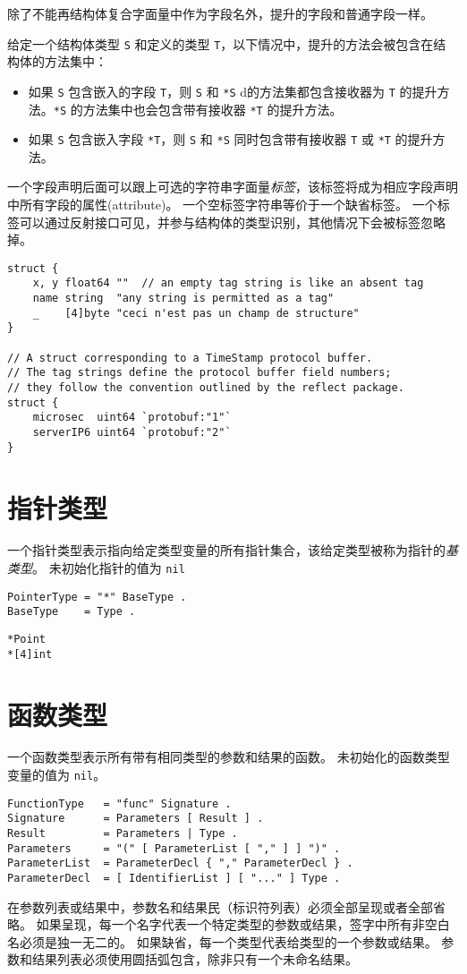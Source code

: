 除了不能再结构体复合字面量中作为字段名外，提升的字段和普通字段一样。

给定一个结构体类型 \lstinline|S| 和定义的类型 \lstinline|T|，以下情况中，提升的方法会被包含在结构体的方法集中：
\begin{itemize}
\item 如果 \lstinline|S| 包含嵌入的字段 \lstinline|T|，则 \lstinline|S| 和 \lstinline|*S| d的方法集都包含接收器为 \lstinline|T| 的提升方法。\lstinline|*S| 的方法集中也会包含带有接收器 \lstinline|*T| 的提升方法。
\item  如果 \lstinline|S| 包含嵌入字段 \lstinline|*T|，则 \lstinline|S| 和 \lstinline|*S| 同时包含带有接收器 \lstinline|T| 或 \lstinline|*T| 的提升方法。
\end{itemize}

一个字段声明后面可以跟上可选的字符串字面量\emph{标签}，该标签将成为相应字段声明中所有字段的属性(attribute)。
一个空标签字符串等价于一个缺省标签。
一个标签可以通过反射接口可见，并参与结构体的类型识别，其他情况下会被标签忽略掉。
\begin{lstlisting}[style=golang]
struct {
	x, y float64 ""  // an empty tag string is like an absent tag
	name string  "any string is permitted as a tag"
	_    [4]byte "ceci n'est pas un champ de structure"
}

// A struct corresponding to a TimeStamp protocol buffer.
// The tag strings define the protocol buffer field numbers;
// they follow the convention outlined by the reflect package.
struct {
	microsec  uint64 `protobuf:"1"`
	serverIP6 uint64 `protobuf:"2"`
}
\end{lstlisting}


\section{指针类型}
一个指针类型表示指向给定类型变量的所有指针集合，该给定类型被称为指针的\emph{基类型}。
未初始化指针的值为 \lstinline|nil|
\begin{lstlisting}[style=EBNF]
PointerType = "*" BaseType .
BaseType    = Type .
\end{lstlisting}

\begin{lstlisting}[style=golang]
*Point
*[4]int
\end{lstlisting}

\section{函数类型}
一个函数类型表示所有带有相同类型的参数和结果的函数。
未初始化的函数类型变量的值为 \lstinline|nil|。
\begin{lstlisting}[style=EBNF]
FunctionType   = "func" Signature .
Signature      = Parameters [ Result ] .
Result         = Parameters | Type .
Parameters     = "(" [ ParameterList [ "," ] ] ")" .
ParameterList  = ParameterDecl { "," ParameterDecl } .
ParameterDecl  = [ IdentifierList ] [ "..." ] Type .
\end{lstlisting}
在参数列表或结果中，参数名和结果民（标识符列表）必须全部呈现或者全部省略。
如果呈现，每一个名字代表一个特定类型的参数或结果，签字中所有非空白名必须是独一无二的。
如果缺省，每一个类型代表给类型的一个参数或结果。
参数和结果列表必须使用圆括弧包含，除非只有一个未命名结果。

